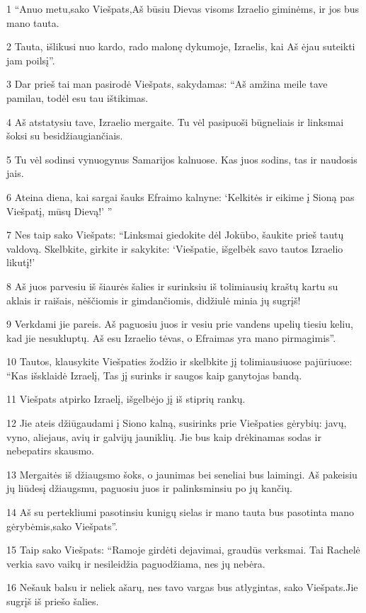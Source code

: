 \par 1 “Anuo metu,­sako Viešpats,­Aš būsiu Dievas visoms Izraelio giminėms, ir jos bus mano tauta. 
\par 2 Tauta, išlikusi nuo kardo, rado malonę dykumoje, Izraelis, kai Aš ėjau suteikti jam poilsį”. 
\par 3 Dar prieš tai man pasirodė Viešpats, sakydamas: “Aš amžina meile tave pamilau, todėl esu tau ištikimas. 
\par 4 Aš atstatysiu tave, Izraelio mergaite. Tu vėl pasipuoši būgneliais ir linksmai šoksi su besidžiaugiančiais. 
\par 5 Tu vėl sodinsi vynuogynus Samarijos kalnuose. Kas juos sodins, tas ir naudosis jais. 
\par 6 Ateina diena, kai sargai šauks Efraimo kalnyne: ‘Kelkitės ir eikime į Sioną pas Viešpatį, mūsų Dievą!’ ” 
\par 7 Nes taip sako Viešpats: “Linksmai giedokite dėl Jokūbo, šaukite prieš tautų valdovą. Skelbkite, girkite ir sakykite: ‘Viešpatie, išgelbėk savo tautos Izraelio likutį!’ 
\par 8 Aš juos parvesiu iš šiaurės šalies ir surinksiu iš tolimiausių kraštų kartu su aklais ir raišais, nėščiomis ir gimdančiomis, didžiulė minia jų sugrįš! 
\par 9 Verkdami jie pareis. Aš paguosiu juos ir vesiu prie vandens upelių tiesiu keliu, kad jie nesukluptų. Aš esu Izraelio tėvas, o Efraimas yra mano pirmagimis”. 
\par 10 Tautos, klausykite Viešpaties žodžio ir skelbkite jį tolimiausiuose pajūriuose: “Kas išsklaidė Izraelį, Tas jį surinks ir saugos kaip ganytojas bandą. 
\par 11 Viešpats atpirko Izraelį, išgelbėjo jį iš stiprių rankų. 
\par 12 Jie ateis džiūgaudami į Siono kalną, susirinks prie Viešpaties gėrybių: javų, vyno, aliejaus, avių ir galvijų jauniklių. Jie bus kaip drėkinamas sodas ir nebepatirs skausmo. 
\par 13 Mergaitės iš džiaugsmo šoks, o jaunimas bei seneliai bus laimingi. Aš pakeisiu jų liūdesį džiaugsmu, paguosiu juos ir palinksminsiu po jų kančių. 
\par 14 Aš su pertekliumi pasotinsiu kunigų sielas ir mano tauta bus pasotinta mano gėrybėmis,­sako Viešpats”. 
\par 15 Taip sako Viešpats: “Ramoje girdėti dejavimai, graudūs verksmai. Tai Rachelė verkia savo vaikų ir nesileidžia paguodžiama, nes jų nebėra. 
\par 16 Nešauk balsu ir neliek ašarų, nes tavo vargas bus atlygintas,­ sako Viešpats.­Jie sugrįš iš priešo šalies. 
